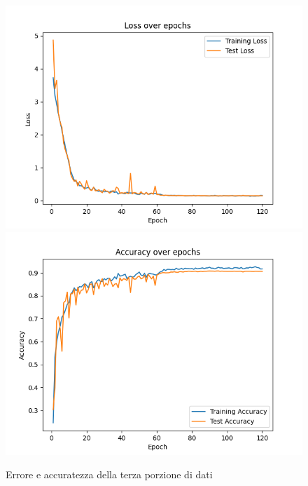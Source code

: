\begin{figure}[!ht]
	\begin{adjustbox}{width=0.9\columnwidth, center}
    \includegraphics{./images/fold_2_loss.png} \includegraphics{./images/fold_2_accuracy.png}
  \end{adjustbox}
  \caption{Errore e accuratezza della terza porzione di dati}
  \label{fig:loss e accuratezza della terza porzione di dati}
\end{figure}

